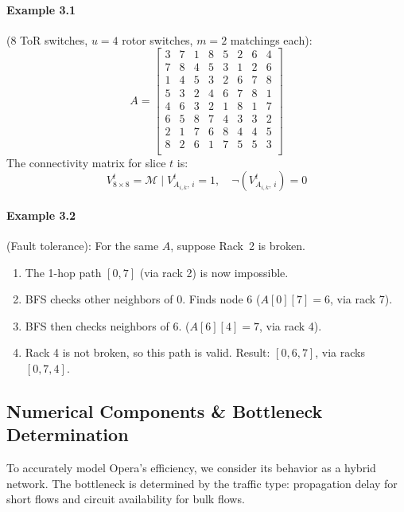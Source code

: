 \documentclass{article}
\begin{document}
    \paragraph{Example 3.1} (8 ToR switches, $u=4$ rotor switches, $m=2$ matchings each):
    \[
        A =
        \begin{bmatrix}
            3 & 7 & 1 & 8 & 5 & 2 & 6 & 4 \\
            7 & 8 & 4 & 5 & 3 & 1 & 2 & 6 \\
            1 & 4 & 5 & 3 & 2 & 6 & 7 & 8 \\
            5 & 3 & 2 & 4 & 6 & 7 & 8 & 1 \\
            4 & 6 & 3 & 2 & 1 & 8 & 1 & 7 \\
            6 & 5 & 8 & 7 & 4 & 3 & 3 & 2 \\
            2 & 1 & 7 & 6 & 8 & 4 & 4 & 5 \\
            8 & 2 & 6 & 1 & 7 & 5 & 5 & 3 \\
        \end{bmatrix}
    \]
    The connectivity matrix for slice $t$ is:
    \[
        V^{t}_{8 \times 8} = \mathscr{M} \mid V^{t}_{A_{i,k},\,i} = 1, \quad \neg(V^{t}_{A_{i,k},\,i}) = 0
    \]

    \paragraph{Example 3.2} (Fault tolerance): For the same $A$, suppose Rack~2 is broken.
    \begin{enumerate}
        \item The 1-hop path $[0, 7]$ (via rack 2) is now impossible.
        \item BFS checks other neighbors of 0. Finds node 6 ($A[0][7] = 6$, via rack 7).
        \item BFS then checks neighbors of 6. ($A[6][4] = 7$, via rack 4).
        \item Rack 4 is not broken, so this path is valid. Result: $[0, 6, 7]$, via racks $[0, 7, 4]$.
    \end{enumerate}
    \subsection{Numerical Components \& Bottleneck Determination}
    To accurately model Opera's efficiency, we consider its behavior as a hybrid network. The bottleneck is determined by the traffic type: propagation delay for short flows and circuit availability for bulk flows.
\end{document}
